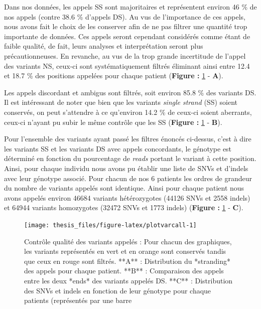 \documentclass[12pt,twoside]{reedthesis}
\theoremstyle{definition}
\theoremstyle{definition}
\theoremstyle{remark}
\begin{document}
  Dans nos données, les appels SS sont majoritaires et représentent
  environ 46 \% de nos appels (contre 38.6 \% d'appels DS). Au vus de
  l'importance de ces appels, nous avons fait le choix de les conserver
  afin de ne pas filtrer une quantité trop importante de données. Ces
  appels seront cependant considérés comme étant de faible qualité, de
  fait, leurs analyses et interprétation seront plus précautionneuses. En
  revanche, au vus de la trop grande incertitude de l'appel des variants
  NS, ceux-ci sont systématiquement filtrés éliminant ainsi entre 12.4 et
  18.7 \% des positions appelées pour chaque patient (\textbf{Figure :
  }\ref{fig:plotvarcall} - \textbf{A}).
  
  Les appels discordant et ambigus sont filtrés, soit environ 85.8 \% des
  variants DS. Il est intéressant de noter que bien que les variants
  \emph{single strand} (SS) soient conservés, on peut s'attendre à ce
  qu'environ 14.2 \% de ceux-ci soient aberrants, ceux-ci n'ayant pu subir
  le même contrôle que les SS (\textbf{Figure : }\ref{fig:plotvarcall} -
  \textbf{B}).
  
  Pour l'ensemble des variants ayant passé les filtres énoncés ci-dessus,
  c'est à dire les variants SS et les variants DS avec appels concordants,
  le génotype est déterminé en fonction du pourcentage de \emph{reads}
  portant le variant à cette position. Ainsi, pour chaque individu nous
  avons pu établir une liste de SNVs et d'indels avec leur génotype
  associé. Pour chacun de nos 6 patients les ordres de grandeur du nombre
  de variants appelés sont identique. Ainsi pour chaque patient nous avons
  appelés environ 46684 variants hétérozygotes (44126 SNVs et 2558 indels)
  et 64944 variants homozygotes (32472 SNVs et 1773 indels)
  (\textbf{Figure : }\ref{fig:plotvarcall} - \textbf{C}).
  
  \newpage
  
  \begin{figure}
  
  {\centering \texttt{[image: thesis\_files/figure-latex/plotvarcall-1]} 
  
  }
  
  \caption[Contrôle qualité des variants appelés]{Contrôle qualité des variants appelés : Pour chacun des graphiques, les variants représentés en vert et en orange sont conservés tandis que ceux en rouge sont filtrés. **A** : Distribution du *stranding* des appels pour chaque patient. **B** : Comparaison des appels entre les deux *ends* des variants appelés DS. **C** : Distribution des SNVs et indels en fonction de leur génotype pour chaque patients (représentés par une barre}\label{fig:plotvarcall}
  \end{figure}
  
\end{document}
